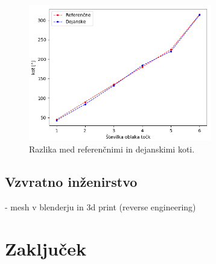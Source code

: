 \documentclass[journal,a4paper,twoside]{sty/IEEEtran}
\begin{document}
\begin{figure}[H]
	\centerline{\includegraphics[width=8cm]{fig/graf_poravnave}}
	\caption{Razlika med referenčnimi in dejanskimi koti.}
	\label{fig:poravnava_graf}
\end{figure}

\subsection{Vzvratno inženirstvo}
-  mesh v blenderju in 3d print (reverse engineering)






\section{Zaključek}
\end{document}

